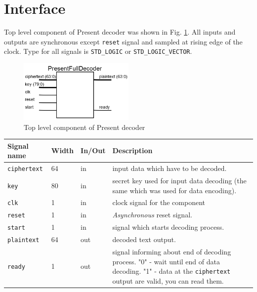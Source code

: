 \documentclass{gajewski}
\begin{document}
\newpage 

\section{Interface}

Top level component of Present decoder was shown in Fig. \ref{pfdec}. All inputs and outputs are synchronous except \texttt{reset} signal and sampled at rising edge of the clock. Type for all signals is \texttt{STD\_LOGIC} or \texttt{STD\_LOGIC\_VECTOR}.
\begin{figure}[!ht]%
    \begin{center}
    \includegraphics[width=0.5\textwidth]{img/PresentFullDecoder.png}
    \caption{%
        Top level component of Present decoder
     }%
    \label{pfdec}
    \end{center}
 \end{figure}

\begin{tabularx}{\textwidth}{|p{30mm}|p{11mm}|p{11mm}|X|}
  \hline \bf{Signal name} & \bf{Width} & \bf{In/Out} & \bf{Description}\\ 
  \hline \texttt{ciphertext}	& 64  &  in  & input data which have to be decoded. \\ 
  \hline \texttt{key}	& 80  &  in  & secret key used for input data decoding (the same which was used for data encoding). \\ 
  \hline \texttt{clk}	& 1  &  in  &  clock signal for the component\\ 
  \hline \texttt{reset} & 1   &  in  & \emph{Asynchronous} reset signal.	\\ 
  \hline \texttt{start} & 1   &  in  & signal which starts decoding process. \\ 
  \hline \texttt{plaintext} & 64   &  out  & decoded text output. \\ 
  \hline \texttt{ready} & 1   &  out  & signal informing about end of decoding process. \newline  "0" - wait until end of data decoding. \newline  "1" - data at the \texttt{ciphertext} output are valid, you can read them. \\ 
  \hline
\end{tabularx}
\end{document}

